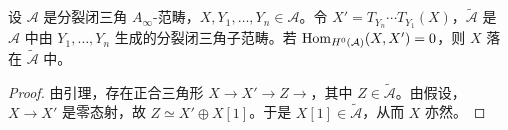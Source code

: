 \begin{theorem}\label{thm:2.7}
设 $\mathcal{A}$ 是分裂闭三角 $A_\infty$-范畴，$X,Y_1,\dots,Y_n\in\mathcal{A}$。令 $X'=T_{Y_n}\cdots T_{Y_1}(X)$，$\widetilde{\mathcal{A}}$ 是 $\mathcal{A}$ 中由 $Y_1,\dots,Y_n$ 生成的分裂闭三角子范畴。若 $\operatorname{Hom}_{H^0(\mathcal{A})}(X,X')=0$，则 $X$ 落在 $\widetilde{\mathcal{A}}$ 中。
\end{theorem}

\begin{proof}
由引理，存在正合三角形 $X\to X'\to Z\to$，其中 $Z\in\widetilde{\mathcal{A}}$。由假设，$X\to X'$ 是零态射，故 $Z\simeq X'\oplus X[1]$。于是 $X[1]\in\widetilde{\mathcal{A}}$，从而 $X$ 亦然。
\end{proof}

